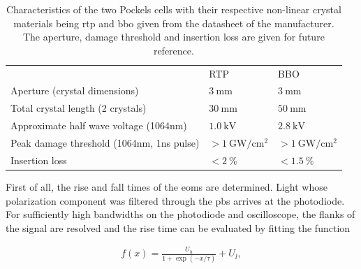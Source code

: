 \begin{table}[tbp]%
\label{tbl:eom_crystals}
\centering
\begin{tabular}{p{6cm} l l}
	\toprule \toprule
                                                                                     & RTP                                       & BBO \\ \thickhline%
Aperture (crystal dimensions)                                                        & $\SI{3}{\milli\meter}$                    & $\SI{3}{\milli\meter}$   \\ \midrule
Total crystal length (2 crystals)                                                    & $\SI{30}{\milli\meter}$                   & $\SI{50}{\milli\meter}$    \\ \midrule
Approximate half wave voltage \newline (1064nm)    & $\SI{1.0}{\kilo \volt}$                   & $\SI{2.8}{\kilo\volt}$    \\ \midrule
Peak damage threshold (1064nm, \newline 1ns pulse) & $> \SI{1}{\giga \watt \per \cm \squared}$ & $> \SI{1}{\giga \watt \per \cm \squared}$   \\ \midrule
Insertion loss                                                                       & $< \SI{2}{\percent}$                      & $< \SI{1.5}{\percent} $ \\ \bottomrule \bottomrule
\end{tabular}
\caption{Characteristics of the two Pockels cells with their respective non-linear crystal materials being \ac{rtp} and \ac{bbo} given from the datasheet of the manufacturer. The aperture, damage threshold and insertion loss are given for future reference.}
\end{table}

First of all, the rise and fall times of the \acp{eom} are determined. Light whose polarization component was filtered through the \ac{pbs} arrives at the photodiode. For sufficiently high bandwidths on the photodiode and oscilloscope, the flanks of the signal are resolved and the rise time can be evaluated by fitting the function

\begin{align}
	f(x) = \frac{U_h}{1 + \exp{(-x/\tau)}} + U_l,
\end{align}

